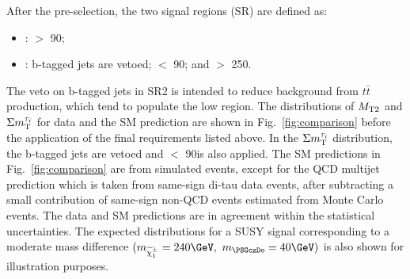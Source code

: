 After the pre-selection, the two signal regions (SR) are defined as:
\begin{itemize}
\item {\bf \binone}: \mttwo $>$ 90\GeV;
\item {\bf \bintwo}: b-tagged jets are vetoed; \mttwo $<$ 90\GeV; and \SumMT $>$ 250\GeV.
\end{itemize}
The veto on b-tagged jets in SR2 is intended to reduce
background from $t\bar{t}$ production, which
tend to populate the low \mttwo region. %
The distributions of ${M_{\rm T2}}$ and $\Sigma m_{\rm T}^{\tau_i}$ for data and the SM prediction
are shown in Fig.~\ref{fig:comparison} before the application of the final
requirements listed above.
In the $\Sigma m_{\rm T}^{\tau_i}$ distribution, the b-tagged jets are vetoed and \mttwo $<$ 90\GeV is also applied.
The SM predictions in Fig.~\ref{fig:comparison} 
are from simulated events, except for the
QCD multijet prediction which is taken from same-sign di-tau data events,
after subtracting a small contribution of same-sign non-QCD events estimated from Monte Carlo events.
The data and SM predictions are in agreement within the statistical uncertainties.
The expected distributions for a SUSY signal 
corresponding to a moderate mass difference $(m_{\chione}=240\GeV,~m_{\PSGczDo}=40\GeV)$
is also shown for illustration purposes.
